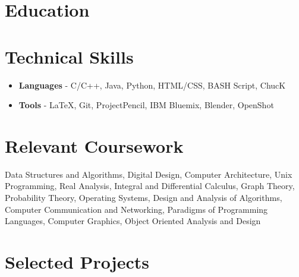 \documentclass[12pt,a4paper,roman]{moderncv}        %
\title{}                               %
\begin{document}
\makecvtitle

\footnotesize{\section{\small{Education}}}


\section{\small{Technical Skills}}
\begin{itemize}
\item{\textbf{Languages} - C/C++, Java, Python, HTML/CSS, BASH Script, ChucK}
\item{\textbf{Tools} - \LaTeX , Git, ProjectPencil, IBM Bluemix, Blender, OpenShot}
\end{itemize}

\section{\small{Relevant Coursework}}

Data Structures and Algorithms, Digital Design, Computer Architecture, Unix Programming, Real Analysis, Integral and Differential Calculus, Graph Theory, Probability Theory, Operating Systems, Design and Analysis of Algorithms, Computer Communication and Networking, Paradigms of Programming Languages, Computer Graphics, Object Oriented Analysis and Design

\section{\small{Selected Projects}}
\end{document}
